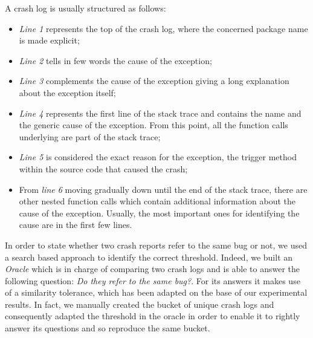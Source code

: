 A crash log is usually structured as follows: 
\begin{itemize}
\item \textit{Line 1} represents the top of the crash log, where the concerned package name is made explicit;
\item \textit{Line 2} tells in few words the cause of the exception; 
\item \textit{Line 3} complements the cause of the exception giving a long explanation about the exception itself;
\item \textit{Line 4} represents the first line of the stack trace and contains the name and the generic cause of the exception. 
From this point, all the function calls underlying are part of the stack trace;
\item \textit{Line 5} is considered the exact reason for the exception, \ie the trigger method within the source code that caused the crash;
\item From \textit{line 6} moving gradually down until the end of the stack trace, there are other nested function calls which contain additional information about the cause of the exception. Usually, the most important ones for identifying the cause are in the first few lines. 
\end{itemize}
In order to state whether two crash reports refer to the same bug or not, we used a search based approach to identify the correct threshold. 
Indeed, we built an \textit{Oracle} which is in charge of comparing two crash logs and is able to answer the following question: \textit{Do they refer to the same bug?}. 
For its answers it makes use of a similarity tolerance, which has been adapted on the base of our experimental results. 
In fact, we manually created the bucket of unique crash logs and consequently adapted the threshold in the oracle in order to enable it to rightly answer its questions and so reproduce the same bucket. 

